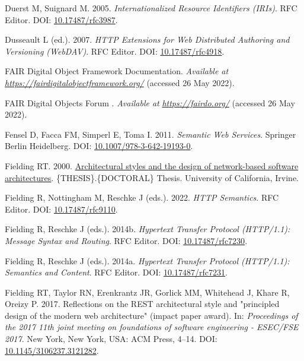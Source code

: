 \begin{CSLReferences}{1}{0}
\leavevmode{}%
Duerst M, Suignard M. 2005. \emph{Internationalized Resource Identifiers (IRIs)}. RFC Editor. DOI: \href{https://doi.org/10.17487/rfc3987}{10.17487/rfc3987}.

\leavevmode{}%
Dusseault L (ed.). 2007. \emph{HTTP Extensions for Web Distributed Authoring and Versioning (WebDAV)}. RFC Editor. DOI: \href{https://doi.org/10.17487/rfc4918}{10.17487/rfc4918}.

\leavevmode{}%
FAIR Digital Object Framework Documentation. \emph{Available at} \href{https://fairdigitalobjectframework.org/}{\emph{https://fairdigitalobjectframework.org/}} (accessed 26 May 2022).

\leavevmode{}%
FAIR Digital Objects Forum \textbar. \emph{Available at} \href{https://fairdo.org/}{\emph{https://fairdo.org/}} (accessed 26 May 2022).

\leavevmode{}%
Fensel D, Facca FM, Simperl E, Toma I. 2011. \emph{Semantic Web Services}. Springer Berlin Heidelberg. DOI: \href{https://doi.org/10.1007/978-3-642-19193-0}{10.1007/978-3-642-19193-0}.

\leavevmode{}%
Fielding RT. 2000. \href{https://www.ics.uci.edu//~fielding/pubs/dissertation/top.htm}{Architectural styles and the design of network-based software architectures}. \{THESIS\}.\{DOCTORAL\} Thesis. University of California, Irvine.

\leavevmode{}%
Fielding R, Nottingham M, Reschke J (eds.). 2022. \emph{HTTP Semantics}. RFC Editor. DOI: \href{https://doi.org/10.17487/rfc9110}{10.17487/rfc9110}.

\leavevmode{}%
Fielding R, Reschke J (eds.). 2014b. \emph{Hypertext Transfer Protocol (HTTP/1.1): Message Syntax and Routing}. RFC Editor. DOI: \href{https://doi.org/10.17487/rfc7230}{10.17487/rfc7230}.

\leavevmode{}%
Fielding R, Reschke J (eds.). 2014a. \emph{Hypertext Transfer Protocol (HTTP/1.1): Semantics and Content}. RFC Editor. DOI: \href{https://doi.org/10.17487/rfc7231}{10.17487/rfc7231}.

\leavevmode{}%
Fielding RT, Taylor RN, Erenkrantz JR, Gorlick MM, Whitehead J, Khare R, Oreizy P. 2017. Reflections on the REST architectural style and "principled design of the modern web architecture" (impact paper award). In: \emph{Proceedings of the 2017 11th joint meeting on foundations of software engineering - ESEC/FSE 2017}. New York, New York, USA: ACM Press, 4--14. DOI: \href{https://doi.org/10.1145/3106237.3121282}{10.1145/3106237.3121282}.


\end{CSLReferences}
